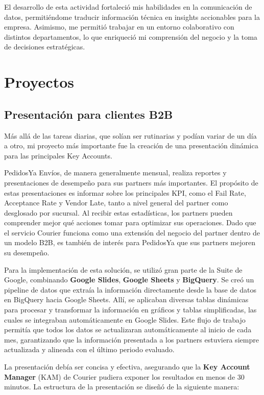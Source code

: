 El desarrollo de esta actividad fortaleció mis habilidades en la comunicación de datos, permitiéndome traducir información técnica en insights accionables para la empresa. Asimismo, me permitió trabajar en un entorno colaborativo con distintos departamentos, lo que enriqueció mi comprensión del negocio y la toma de decisiones estratégicas.


\section{Proyectos}
\subsection{Presentación para clientes B2B}

Más allá de las tareas diarias, que solían ser rutinarias y podían variar de un día a otro, mi proyecto más importante fue la creación de una presentación dinámica para las principales Key Accounts.

PedidosYa Envíos, de manera generalmente mensual, realiza reportes y presentaciones de desempeño para sus partners más importantes. El propósito de estas presentaciones es informar sobre los principales KPI, como el Fail Rate, Acceptance Rate y Vendor Late, tanto a nivel general del partner como desglosado por sucursal. Al recibir estas estadísticas, los partners pueden comprender mejor qué acciones tomar para optimizar sus operaciones. Dado que el servicio Courier funciona como una extensión del negocio del partner dentro de un modelo B2B, es también de interés para PedidosYa que sus partners mejoren su desempeño.

Para la implementación de esta solución, se utilizó gran parte de la Suite de Google, combinando \textbf{Google Slides}, \textbf{Google Sheets} y \textbf{BigQuery}. Se creó un pipeline de datos que extraía la información directamente desde la base de datos en BigQuery hacia Google Sheets. Allí, se aplicaban diversas tablas dinámicas para procesar y transformar la información en gráficos y tablas simplificadas, las cuales se integraban automáticamente en Google Slides. Este flujo de trabajo permitía que todos los datos se actualizaran automáticamente al inicio de cada mes, garantizando que la información presentada a los partners estuviera siempre actualizada y alineada con el último periodo evaluado.

La presentación debía ser concisa y efectiva, asegurando que la \textbf{Key Account Manager} (KAM) de Courier pudiera exponer los resultados en menos de 30 minutos. La estructura de la presentación se diseñó de la siguiente manera:

